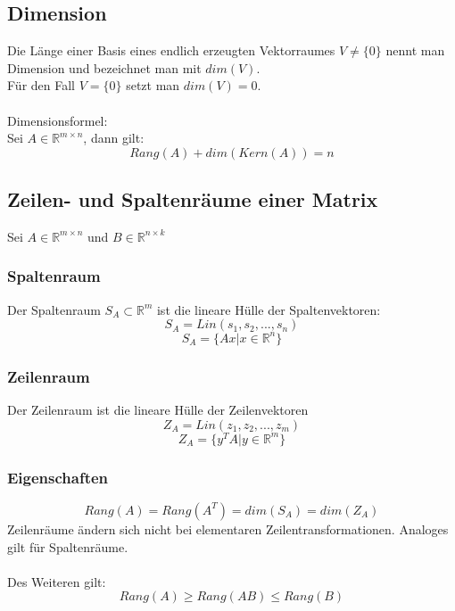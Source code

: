 \documentclass[a4paper,twocolumn,10pt]{article}
\begin{document}
\subsection{Dimension}
Die Länge einer Basis eines endlich erzeugten Vektorraumes $V\neq \{0\}$ nennt man Dimension und bezeichnet man mit $dim(V)$.\\
Für den Fall $V=\{0\}$ setzt man $dim(V)=0$.\\\\
Dimensionsformel:\\
Sei $A\in\mathbb{R}^{m\times n}$, dann gilt:
\begin{equation*}
Rang(A)+dim(Kern(A))=n
\end{equation*}

\subsection{Zeilen- und Spaltenräume einer Matrix}
Sei $A\in\mathbb{R}^{m\times n}$ und $B\in\mathbb{R}^{n\times k}$

\subsubsection{Spaltenraum}
Der Spaltenraum $S_A\subset \mathbb{R}^m$ ist die lineare Hülle der Spaltenvektoren:
\begin{equation*}
S_A=Lin(s_1,s_2,...,s_n)
\end{equation*}
\begin{equation*}
S_A=\{Ax|x\in\mathbb{R}^n\}
\end{equation*}

\subsubsection{Zeilenraum}
Der Zeilenraum ist die lineare Hülle der Zeilenvektoren
\begin{equation*}
Z_A=Lin(z_1,z_2,...,z_m)
\end{equation*}
\begin{equation*}
Z_A=\{y^TA|y\in\mathbb{R}^m\}
\end{equation*}

\subsubsection{Eigenschaften}
\begin{equation*}
Rang(A)=Rang(A^T)=dim(S_A)=dim(Z_A)
\end{equation*}
Zeilenräume ändern sich nicht bei elementaren Zeilentransformationen. Analoges gilt für Spaltenräume.\\\\
Des Weiteren gilt:
\begin{equation*}
Rang(A)\geq Rang(AB)\leq Rang(B)
\end{equation*}
\end{document}
